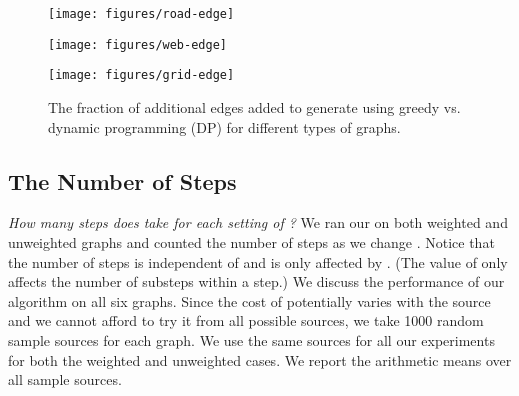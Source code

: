 
\begin{figure}[!t!h]
\begin{center}
    \begin{minipage}[t]{0.45\textwidth}
        \texttt{[image: figures/road-edge]}\\ 
    \end{minipage}
    \begin{minipage}[t]{0.45\textwidth}
        \texttt{[image: figures/web-edge]}\\ 
    \end{minipage}
    \begin{minipage}[t]{0.45\textwidth}
        \texttt{[image: figures/grid-edge]}\\ 
    \end{minipage}
    \caption{The fraction of additional edges added to generate
       using greedy vs. dynamic programming (DP) for different
      types of graphs.}\label{fig:addingedges}
\end{center}
\end{figure}

\subsection{The Number of Steps}
\label{sec:expreduce}

\emph{How many steps does \AlgName{} take for each setting of ?}  We ran
our \AlgName{} on both weighted and unweighted graphs and counted the number of
steps as we change .  Notice that the number of steps is independent of
 and is only affected by . (The value of  only affects the number of
substeps within a step.)  We discuss the performance of our algorithm on all six
graphs.  Since the cost of \sssp potentially varies with the source and we
cannot afford to try it from all possible sources, we take 1000 random sample
sources for each graph.  We use the same  sources for all our experiments
for both the weighted and unweighted cases.  We report the arithmetic means over
all sample sources.






